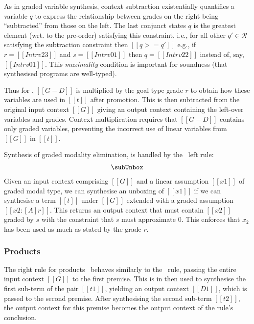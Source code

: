 As in graded variable synthesis, context subtraction existentially quantifies a
variable $q$ to express the relationship
between grades on the right being ``subtracted'' from those on the
left. The last conjunct states
$q$ is the greatest element (wrt.
to the pre-order) satisfying this constraint, i.e., for all
other $q' \in \mathcal{R}$ satisfying the subtraction constraint
then $[[ q >= q']]$ e.g., if $r = [[ Intrv 2 3 ]]$
and $s = [[ Intrv 0 1]]$ then $q = [[ Intrv 2 2 ]]$ instead of, say,
$[[ Intrv 0 1]]$. This \emph{maximality} condition is
important for soundness (that synthesised programs are well-typed).


Thus for \subBoxName, $[[ G - D ]]$ is multiplied by the goal type grade $r$ to obtain how these
  variables are used in $[[t]]$ after promotion. This is then subtracted from
  the original input context $[[G]]$ giving an output context
  containing the left-over variables and grades. Context
  multiplication
  requires that $[[G - D]]$ contains only graded variables,
  preventing the incorrect use of linear variables from $[[G]]$ in
  $[[t]]$.

Synthesis of graded modality elimination, is handled by the
  \subUnboxName\ left rule:
  \begin{align*}
    \subUnbox
    \end{align*}
%
  Given an input context comprising $[[ G ]]$ and a linear
  assumption $[[ x1 ]]$ of graded modal type, we can synthesise an unboxing of
  $[[x1]]$ if we can synthesise a term $[[t]]$ under $[[G]]$
  extended with a graded assumption $[[x2 : [A] r]]$. This returns an output
  context that must contain $[[x2]]$ graded by $s$
  with the constraint that $s$ must approximate $0$. This enforces
  that $x_2$ has been used as much as stated by the grade $r$.

\subsubsection{Products}
The right rule for products \subPairIntroName\ behaves similarly to the
\subAppName\ rule, passing the entire input context $[[ G ]]$ to the first
premise. This is in then used to synthesise the first sub-term of the pair
$[[ t1 ]]$, yielding an output context $ [[ D1 ]]$, which is passed to the
second premise. After synthesising the second sub-term $[[ t2 ]]$, the output
context for this premise becomes the output context of the rule's conclusion.

